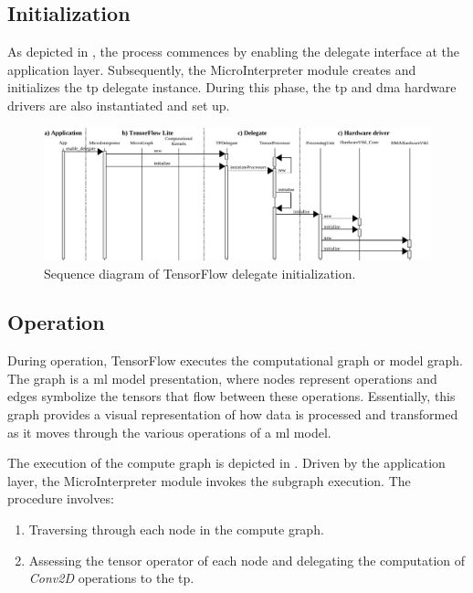 \subsection{Initialization}

As depicted in , the process commences by enabling the delegate interface at the application layer. Subsequently, the MicroInterpreter module creates and initializes the \gls{tp} delegate instance. During this phase, the \gls{tp} and \gls{dma} hardware drivers are also instantiated and set up.

\begin{figure}[h!]
	\centering
	\includegraphics[width=\textwidth]{./figures/sequence_initialize_tf_delagate.pdf}
	\caption{Sequence diagram of TensorFlow delegate initialization.}
	\label{fig:sw_tf_delegate_initialize}
\end{figure}

\subsection{Operation}

During operation, TensorFlow executes the computational graph or model graph. The graph is a \gls{ml} model presentation, where nodes represent operations and edges symbolize the tensors that flow between these operations. Essentially, this graph provides a visual representation of how data is processed and transformed as it moves through the various operations of a \gls{ml} model.

The execution of the compute graph is depicted in . Driven by the application layer, the MicroInterpreter module invokes the subgraph execution. The procedure involves:

\begin{enumerate}
	\item Traversing through each node in the compute graph.
	\item Assessing the tensor operator of each node and delegating the computation of \textit{Conv2D} operations to the \gls{tp}.
\end{enumerate}

